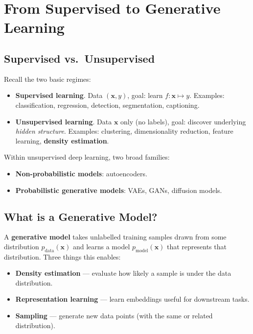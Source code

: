 \documentclass[11pt,a4paper]{article}
\theoremstyle{definition}
\theoremstyle{plain}
\theoremstyle{remark}
\begin{document}
\section{From Supervised to Generative Learning}

\subsection{Supervised vs.\ Unsupervised}

Recall the two basic regimes:

\begin{itemize}
    \item \textbf{Supervised learning}. Data $(\mathbf{x}, y)$, goal: learn $f: \mathbf{x} \mapsto y$. Examples: classification, regression, detection, segmentation, captioning.
    \item \textbf{Unsupervised learning}. Data $\mathbf{x}$ only (no labels), goal: discover underlying \emph{hidden structure}. Examples: clustering, dimensionality reduction, feature learning, \textbf{density estimation}.
\end{itemize}

Within unsupervised deep learning, two broad families:
\begin{itemize}
    \item \textbf{Non-probabilistic models}: autoencoders.
    \item \textbf{Probabilistic generative models}: VAEs, GANs, diffusion models.
\end{itemize}

\subsection{What is a Generative Model?}

A \textbf{generative model} takes unlabelled training samples drawn from some distribution $p_{\text{data}}(\mathbf{x})$ and learns a model $p_{\text{model}}(\mathbf{x})$ that represents that distribution. Three things this enables:
\begin{itemize}
    \item \textbf{Density estimation} --- evaluate how likely a sample is under the data distribution.
    \item \textbf{Representation learning} --- learn embeddings useful for downstream tasks.
    \item \textbf{Sampling} --- generate new data points (with the same or related distribution).
\end{itemize}
\end{document}
